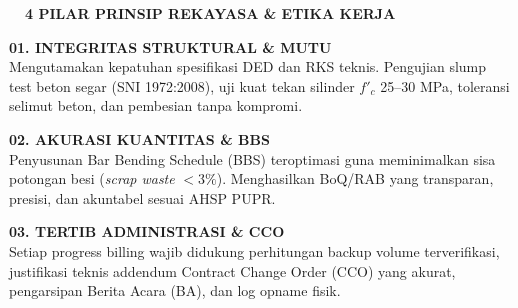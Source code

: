 \documentclass[10pt,a4paper,landscape]{article}
\begin{document}
\begin{minipage}[t]{0.40\linewidth}
  \vspace{0pt}
  \begin{tcolorbox}[sharp corners, boxrule=0.8pt, colframe=pborder, colback=pbglight, left=3.5mm, right=3.5mm, top=2.5mm, bottom=2.5mm, height=154mm]
    \colorbox{pnavy}{\fontsize{7pt}{8pt}\selectfont\bfseries\color{white}\ \ 4 PILAR PRINSIP REKAYASA \& ETIKA KERJA\ \ }\\[2mm]

    \begin{tcolorbox}[sharp corners, boxrule=0.5pt, colframe=pborder, colback=white, left=2.5mm, right=2.5mm, top=2mm, bottom=2mm]
      {\fontsize{7.2pt}{8.5pt}\selectfont\bfseries\color{pred}01. INTEGRITAS STRUKTURAL \& MUTU}\\[0.8mm]
      {\fontsize{6.5pt}{8.2pt}\selectfont\color{psteel}Mengutamakan kepatuhan spesifikasi DED dan RKS teknis. Pengujian slump test beton segar (SNI 1972:2008), uji kuat tekan silinder $f'_c$ 25--30 MPa, toleransi selimut beton, dan pembesian tanpa kompromi.}
    \end{tcolorbox}
    \vspace{1.5mm}

    \begin{tcolorbox}[sharp corners, boxrule=0.5pt, colframe=pborder, colback=white, left=2.5mm, right=2.5mm, top=2mm, bottom=2mm]
      {\fontsize{7.2pt}{8.5pt}\selectfont\bfseries\color{pred}02. AKURASI KUANTITAS \& BBS}\\[0.8mm]
      {\fontsize{6.5pt}{8.2pt}\selectfont\color{psteel}Penyusunan Bar Bending Schedule (BBS) teroptimasi guna meminimalkan sisa potongan besi (\textit{scrap waste} $< 3\%$). Menghasilkan BoQ/RAB yang transparan, presisi, dan akuntabel sesuai AHSP PUPR.}
    \end{tcolorbox}
    \vspace{1.5mm}

    \begin{tcolorbox}[sharp corners, boxrule=0.5pt, colframe=pborder, colback=white, left=2.5mm, right=2.5mm, top=2mm, bottom=2mm]
      {\fontsize{7.2pt}{8.5pt}\selectfont\bfseries\color{pred}03. TERTIB ADMINISTRASI \& CCO}\\[0.8mm]
      {\fontsize{6.5pt}{8.2pt}\selectfont\color{psteel}Setiap progress billing wajib didukung perhitungan backup volume terverifikasi, justifikasi teknis addendum Contract Change Order (CCO) yang akurat, pengarsipan Berita Acara (BA), dan log opname fisik.}
    \end{tcolorbox}
    \vspace{1.5mm}


\end{tcolorbox}
\end{minipage}
\end{document}
